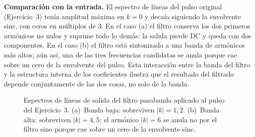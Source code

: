 \documentclass[10pt,a4paper]{article}
\begin{document}
	\textbf{Comparación con la entrada.} El espectro de líneas del pulso original (Ejercicio~3) tenía amplitud máxima en $k = 0$ y decaía siguiendo la envolvente sinc, con ceros en múltiplos de $3$. En el caso (a) el filtro conserva los dos primeros armónicos no nulos y suprime todo lo demás: la salida pierde DC y queda con dos componentes. En el caso (b) el filtro está sintonizado a una banda de armónicos más altos; aún así, una de las tres frecuencias candidatas se anula porque cae sobre un cero de la envolvente del pulso. Esta interacción entre la banda del filtro y la estructura interna de los coeficientes ilustra que el resultado del filtrado depende conjuntamente de las dos cosas, no solo de la banda.

	\begin{figure}[H]
		\centering
		
		\caption{Espectros de líneas de salida del filtro pasabanda aplicado al pulso del Ejercicio~3. (a)~Banda baja: sobreviven $|k|=1,2$. (b)~Banda alta: sobreviven $|k|=4,5$; el armónico $|k|=6$ se anula no por el filtro sino porque cae sobre un cero de la envolvente sinc.}
		\label{fig:ej12}
	\end{figure}
\end{document}
